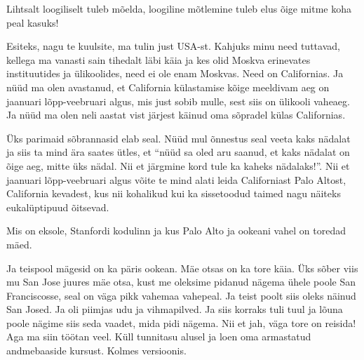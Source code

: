 
Lihtsalt loogiliselt tuleb mõelda, loogiline mõtlemine tuleb elus õige mitme 
koha peal kasuks! 


Esiteks, nagu te kuulsite, ma tulin just USA-st. Kahjuks minu need tuttavad, 
kellega ma vanasti sain tihedalt läbi  käia ja kes olid Moskva erinevates 
instituutides ja ülikoolides, need ei ole enam Moskvas. Need on Californias. Ja 
nüüd ma olen avastanud, et California külastamise kõige meeldivam aeg on 
jaanuari lõpp-veebruari algus, mis just sobib mulle, sest siis on ülikooli 
vaheaeg. Ja nüüd ma olen neli aastat vist järjest käinud oma sõpradel külas 
Californias. 

Üks parimaid sõbrannasid elab seal. Nüüd mul õnnestus seal veeta kaks nädalat 
ja siis ta mind ära saates ütles, et \enquote{nüüd sa oled aru saanud, et  kaks 
nädalat on õige aeg, mitte üks nädal. Nii et järgmine kord tule ka kaheks 
nädalaks!}. Nii et jaanuari lõpp-veebruari algus võite te mind alati leida 
Californiast Palo Altost, California kevadest, kus nii kohalikud kui ka 
sissetoodud taimed nagu näiteks eukalüptipuud õitsevad. 


Mis on eksole, Stanfordi kodulinn ja kus Palo Alto ja ookeani vahel on toredad 
mäed. 

Ja teispool mägesid on ka päris ookean. Mäe otsas on ka tore käia. Üks sõber 
viis mu San Jose juures mäe otsa, kust me oleksime pidanud nägema ühele poole 
San Franciscosse, seal on väga pikk vahemaa vahepeal. Ja teist poolt siis oleks 
näinud San Josed. Ja oli piimjas udu ja vihmapilved. Ja siis korraks tuli tuul 
ja lõuna poole nägime siis seda vaadet, mida pidi nägema. Nii et jah, väga tore 
on reisida! Aga ma siin töötan veel. Küll tunnitasu alusel ja loen oma 
armastatud andmebaaside kursust. Kolmes versioonis. 
